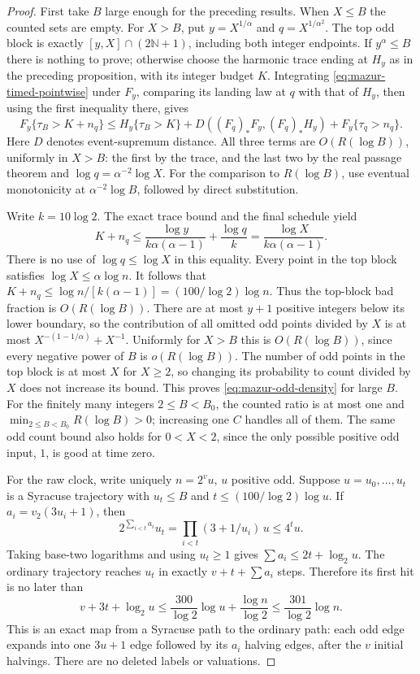 \documentclass[11pt]{article}
\theoremstyle{remark}\newtheorem{remark}[proposition]{Remark}
\begin{document}
\begin{proof}
First take \(B\) large enough for the preceding results.
When \(X\le B\) the counted sets are empty.
For \(X>B\), put \(y=X^{1/\alpha}\) and
\(q=X^{1/\alpha^2}\). The top odd block is exactly
\([y,X]\cap(2\mathbb N+1)\), including both integer endpoints.
If \(y^\alpha\le B\) there is nothing to prove; otherwise choose
the harmonic trace ending at \(H_y\) as in the preceding proposition,
with its integer budget \(K\). Integrating
\eqref{eq:mazur-timed-pointwise} under \(F_y\), comparing its
landing law at \(q\) with that of \(H_y\), then using the first
inequality there, gives
\[
 F_y\{\tau_B>K+n_q\}
 \le H_y\{\tau_B>K\}
    +D((F_q)_*F_y,(F_q)_*H_y)
    +F_y\{\tau_q>n_q\}.
\]
Here \(D\) denotes event-supremum distance. All three terms are
\(O(R(\log B))\), uniformly in \(X>B\): the first by the trace,
and the last two by the real passage theorem and
\(\log q=\alpha^{-2}\log X\).
For the comparison to \(R(\log B)\), use eventual monotonicity at
\(\alpha^{-2}\log B\), followed by direct substitution.

Write \(k=10\log2\). The exact trace bound and the final schedule yield
\[
 K+n_q\le
 \frac{\log y}{k\alpha(\alpha-1)}+\frac{\log q}{k}
 =\frac{\log X}{k\alpha(\alpha-1)}.
\]
There is no use of \(\log q\le\log X\) in this equality.
Every point in the top block satisfies \(\log X\le\alpha\log n\).
It follows that \(K+n_q\le\log n/[k(\alpha-1)]
=(100/\log2)\log n\).
Thus the top-block bad fraction is \(O(R(\log B))\).
There are at most \(y+1\) positive integers below its lower boundary,
so the contribution of all omitted odd points divided by \(X\) is
at most \(X^{-(1-1/\alpha)}+X^{-1}\).
Uniformly for \(X>B\) this is \(O(R(\log B))\), since every negative
power of \(B\) is \(o(R(\log B))\).
The number of odd points in the top block is at most \(X\) for
\(X\ge2\), so changing its probability to count divided by \(X\)
does not increase its bound. This proves \eqref{eq:mazur-odd-density}
for large \(B\).
For the finitely many integers \(2\le B<B_0\), the counted ratio
is at most one and \(\min_{2\le B<B_0}R(\log B)>0\);
increasing one \(C\) handles all of them. The same odd count bound
also holds for \(0<X<2\), since the only possible positive odd input,
\(1\), is good at time zero.

For the raw clock, write uniquely \(n=2^v u\), \(u\) positive odd.
Suppose \(u=u_0,\ldots,u_t\) is a Syracuse trajectory with \(u_t\le B\)
and \(t\le(100/\log2)\log u\).
If \(a_i=v_2(3u_i+1)\), then
\[
 2^{\sum_{i<t}a_i}u_t=\prod_{i<t}(3+1/u_i)\,u
 \le 4^t u.
\]
Taking base-two logarithms and using \(u_t\ge1\) gives
\(\sum a_i\le2t+\log_2u\). The ordinary trajectory reaches
\(u_t\) in exactly \(v+t+\sum a_i\) steps. Therefore its first
hit is no later than
\[
 v+3t+\log_2u
 \le \frac{300}{\log2}\log u+\frac{\log n}{\log2}
 \le \frac{301}{\log2}\log n.
\]
This is an exact map from a Syracuse path to the ordinary path:
each odd edge expands into one \(3u+1\) edge followed by its
\(a_i\) halving edges, after the \(v\) initial halvings.
There are no deleted labels or valuations.


\end{proof}
\end{document}
